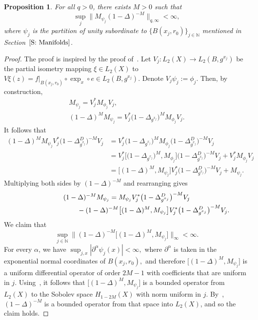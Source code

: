 \documentclass[pdftex]{sigma}
\numberwithin{equation}{section}
\newtheorem{Proposition}[Theorem]{Proposition}
 { \theoremstyle{definition}
\newtheorem{Definition}[Theorem]{Definition}
\newtheorem{Note}[Theorem]{Note}
\newtheorem{Example}[Theorem]{Example}
\newtheorem{Remark}[Theorem]{Remark} }
\begin{document}
\begin{Proposition}
For all $q>0$, there exists $M>0$ such that
\[
 \sup_{j} \big\|M_{\psi_j}(1-\Delta)^{-M}\big\|_{q,\infty} < \infty,
\]
where $\psi_j$ is the partition of unity subordinate to $\{B(x_j, r_0)\}_{j \in \mathbb{N}}$ mentioned in Section~$\ref{S: Manifolds}$.
\end{Proposition}
\begin{proof}
The proof is inspired by the proof of~\cite[Lemma~3.4.8]{SukochevZanin2018}. Let $V_j\colon L_2(X) \to L_2(B, g^{x_j})$ be the partial isometry mapping $\xi \in L_2(X)$ to $V\xi (z) = f|_{B(x_j, r_0)} \circ \exp_x \circ e \in L_2(B, g^{x_j})$. Denote $V_j\psi_j := \phi_j$. Then, by construction,
\begin{gather*}
M_{\psi_j} = V_j^* M_{\phi_j} V_j,
\\
(1-\Delta)^M M_{\psi_j} = V_j^* \big(1-\Delta_{g^{x_j}}\big)^M M_{\phi_j} V_j.
\end{gather*}
It follows that
\begin{align*}
 (1-\Delta)^M M_{\psi_j} V_j^* \big(1-\Delta_{g^{x_j}}^D\big)^{-M} V_j &{}= V_j^* \big(1-\Delta_{g^{x_j}}\big)^M M_{\phi_j} \big(1-\Delta_{g^{x_j}}^D\big)^{-M} V_j\\
 &{}=V_j^* \big[\big(1-\Delta_{g^{x_j}}\big)^M, M_{\phi_j}\big] \big(1-\Delta_{g^{x_j}}^D\big)^{-M} V_j + V_j^* M_{\phi_j} V_j\\
 &{}= \big[(1-\Delta)^M, M_{\psi_j}\big] V_j^* \big(1-\Delta_{g^{x_j}}^D\big)^{-M} V_j + M_{\psi_j}.
\end{align*}
Multiplying both sides by $(1-\Delta)^{-M}$ and rearranging gives
\begin{gather*}
 (1-\Delta)^{-M}M_{\psi_j} = M_{\psi_j} V_j^* \big(1-\Delta_{g^{x_j}}^D\big)^{-M} V_j \\
 \hphantom{(1-\Delta)^{-M}M_{\psi_j} =}{}
 - (1-\Delta)^{-M}\big[(1-\Delta)^M, M_{\psi_j}\big] V_j^* \big(1-\Delta_{g^{x_j}}^D\big)^{-M} V_j.
\end{gather*}
We claim that
\[
\sup_{j \in \mathbb{N}} \big\| (1-\Delta)^{-M}\big[(1-\Delta)^M, M_{\psi_j}\big] \big\|_\infty < \infty.
\]
For every $\alpha$, we have $\sup_{j,x} |\partial^{\alpha}\psi_j(x)|<\infty,$ where $\partial^{\alpha}$ is taken in the exponential normal coordinates of $B(x_j,r_0),$ and therefore $\big[(1-\Delta)^M, M_{\psi_j}\big]$ is a uniform differential operator of order $2M-1$ with coefficients that are uniform in $j$. Using~\cite[Theorem~3.9]{Kordyukov1991}, it follows that $\big[(1-\Delta)^M, M_{\psi_j}\big]$ is a bounded operator from $L_2(X)$ to the Sobolev space $H_{1-2M}(X)$ with norm uniform in $j$. By~\cite[Proposition~4.4]{Kordyukov1991}, $(1-\Delta)^{-M}$ is a bounded operator from that space into $L_2(X)$, and so the claim holds.


\end{proof}
\end{document}
